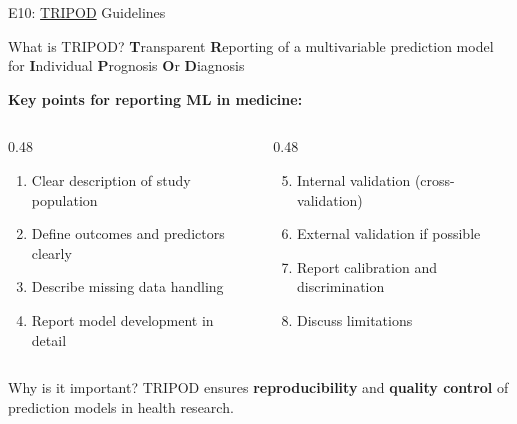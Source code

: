 \documentclass[aspectratio=169, 10pt]{beamer}
\begin{document}
\begin{frame}{E10: \href{https://www.tripod-statement.org/}{TRIPOD} Guidelines}

    \begin{block}{What is TRIPOD?}
        \textbf{T}ransparent \textbf{R}eporting of a multivariable prediction model for \textbf{I}ndividual \textbf{P}rognosis \textbf{O}r \textbf{D}iagnosis
    \end{block}
    
    \vspace{3mm}
    
    \textbf{Key points for reporting ML in medicine:}
    
    \begin{columns}
        \begin{column}{0.48\textwidth}
            \begin{enumerate}
                \item Clear description of study population
                \item Define outcomes and predictors clearly
                \item Describe missing data handling
                \item Report model development in detail
            \end{enumerate}
        \end{column}
        
        \begin{column}{0.48\textwidth}
            \begin{enumerate}
                \setcounter{enumi}{4}
                \item Internal validation (cross-validation)
                \item External validation if possible
                \item Report calibration and discrimination
                \item Discuss limitations
            \end{enumerate}
        \end{column}
    \end{columns}
    
    \vspace{5mm}
    
    \begin{alertblock}{Why is it important?}
        TRIPOD ensures \textbf{reproducibility} and \textbf{quality control} of prediction models in health research.
    \end{alertblock}
    
\end{frame}
\end{document}

